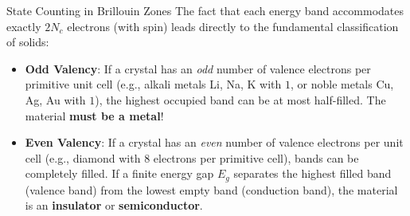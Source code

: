 \documentclass[11pt,a4paper]{article}
\begin{document}
\begin{takeawaybox}{State Counting in Brillouin Zones}
The fact that each energy band accommodates exactly $2N_c$ electrons (with spin) leads directly to the fundamental classification of solids:
\begin{itemize}
    \item \textbf{Odd Valency}: If a crystal has an \emph{odd} number of valence electrons per primitive unit cell (e.g., alkali metals Li, Na, K with $1$, or noble metals Cu, Ag, Au with $1$), the highest occupied band can be at most half-filled. The material \textbf{must be a metal}!
    \item \textbf{Even Valency}: If a crystal has an \emph{even} number of valence electrons per unit cell (e.g., diamond with $8$ electrons per primitive cell), bands can be completely filled. If a finite energy gap $E_g$ separates the highest filled band (valence band) from the lowest empty band (conduction band), the material is an \textbf{insulator} or \textbf{semiconductor}.
\end{itemize}
\end{takeawaybox}

\vspace{0.4cm}
\end{document}
